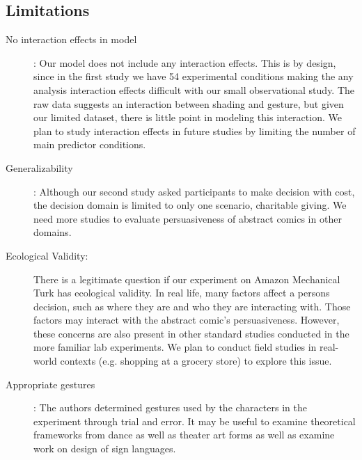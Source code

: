 \subsection{Limitations}
\begin{description}
 \item[No interaction effects in model]: Our model does not include any interaction effects. This is by design, since in the first study we have 54 experimental conditions making the any analysis interaction effects difficult with our small observational study. The raw data suggests an interaction between shading and gesture, but given our limited dataset, there is little point in modeling this interaction. We plan to study interaction effects in future studies by limiting the number of main predictor conditions.
 \item[Generalizability]:  Although our second study asked participants to make decision with cost, the decision domain is limited to only one scenario, charitable giving. We need more studies to evaluate persuasiveness of abstract comics in other domains.

 \item[Ecological Validity:] There is a legitimate question if our experiment on Amazon Mechanical Turk has ecological validity.  In real life, many factors  affect a persons decision, such as where they are and who they are interacting with. Those factors may interact with the abstract comic's persuasiveness. However, these concerns are also present in other standard studies conducted in the more familiar lab experiments. We plan to conduct field studies in real-world contexts (e.g. shopping at a grocery store) to explore this issue.
 
 \item[Appropriate gestures]: The authors determined gestures used by the characters in the experiment through trial and error. It may be useful to examine  theoretical frameworks from dance as well as theater art forms as well as examine work on design of sign languages.
\end{description}

